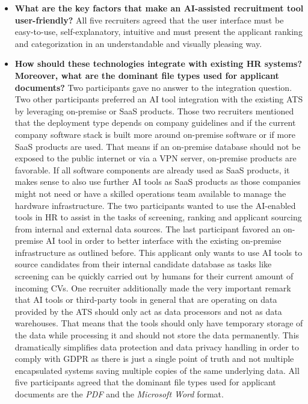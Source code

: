 \documentclass[draft,final]{thesisclass} %
\begin{document}
\begin{enumerate}
\begin{itemize}
        \item \textbf{What are the key factors that make an \acs{AI}-assisted recruitment tool user-friendly?}
        All five recruiters agreed that the user interface must be easy-to-use, self-explanatory, intuitive and must present the applicant ranking and categorization in an understandable and visually pleasing way.
        \item \textbf{How should these technologies integrate with existing \acs{HR} systems? Moreover, what are the dominant file types used for applicant documents?}
        Two participants gave no answer to the integration question. Two other participants preferred an \acs{AI} tool integration with the existing \acs{ATS} by leveraging on-premise or \acs{SaaS} products. Those two recruiters mentioned that the deployment type depends on company guidelines and if the current company software stack is built more around on-premise software or if more \acs{SaaS} products are used. That means if an on-premise database should not be exposed to the public internet or via a VPN server, on-premise products are favorable. If all software components are already used as \acs{SaaS} products, it makes sense to also use further \acs{AI} tools as \acs{SaaS} products as those companies might not need or have a skilled operations team available to manage the hardware infrastructure. The two participants wanted to use the \acs{AI}-enabled tools in \acs{HR} to assist in the tasks of screening, ranking and applicant sourcing from internal and external data sources. 
        The last participant favored an on-premise \acs{AI} tool in order to better interface with the existing on-premise infrastructure as outlined before. This applicant only wants to use \acs{AI} tools to source candidates from their internal candidate database as tasks like screening can be quickly carried out by humans for their current amount of incoming \acs{CV}s.
        One recruiter additionally made the very important remark that \acs{AI} tools or third-party tools in general that are operating on data provided by the \acs{ATS} should only act as data processors and not as data warehouses. That means that the tools should only have temporary storage of the data while processing it and should not store the data permanently. 
        This dramatically simplifies data protection and data privacy handling in order to comply with \acs{GDPR} as there is just a single point of truth and not multiple encapsulated systems saving multiple copies of the same underlying data.
        All five participants agreed that the dominant file types used for applicant documents are the \textit{PDF} and the \textit{Microsoft Word} format.

\end{itemize}
\end{enumerate}
\end{document}
